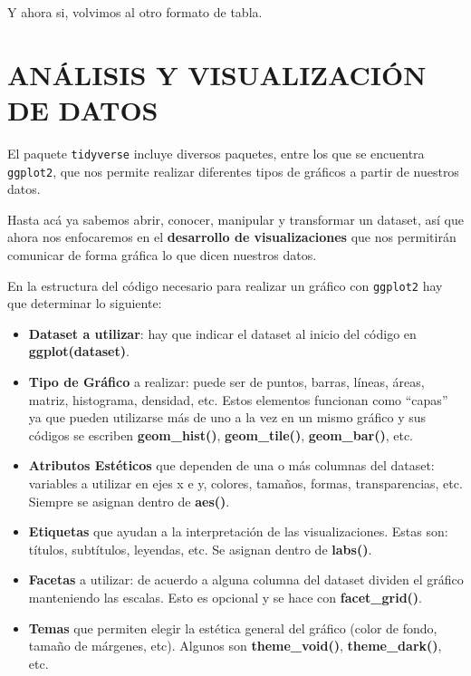 \documentclass[
  spanish,
]{book}
\providecommand{\tightlist}{%
  \setlength{\itemsep}{0pt}\setlength{\parskip}{0pt}}
\begin{document}
Y ahora si, volvimos al otro formato de tabla.

\hypertarget{anuxe1lisis-y-visualizaciuxf3n-de-datos}{%
\chapter{ANÁLISIS Y VISUALIZACIÓN DE DATOS}\label{anuxe1lisis-y-visualizaciuxf3n-de-datos}}

El paquete \texttt{tidyverse} incluye diversos paquetes, entre los que se encuentra \texttt{ggplot2}, que nos permite realizar diferentes tipos de gráficos a partir de nuestros datos.

Hasta acá ya sabemos abrir, conocer, manipular y transformar un dataset, así que ahora nos enfocaremos en el \textbf{desarrollo de visualizaciones} que nos permitirán comunicar de forma gráfica lo que dicen nuestros datos.

En la estructura del código necesario para realizar un gráfico con \texttt{ggplot2} hay que determinar lo siguiente:

\begin{itemize}
\tightlist
\item
  \textbf{Dataset a utilizar}: hay que indicar el dataset al inicio del código en \textbf{ggplot(dataset)}.
\item
  \textbf{Tipo de Gráfico} a realizar: puede ser de puntos, barras, líneas, áreas, matriz, histograma, densidad, etc. Estos elementos funcionan como ``capas'' ya que pueden utilizarse más de uno a la vez en un mismo gráfico y sus códigos se escriben \textbf{geom\_hist()}, \textbf{geom\_tile()}, \textbf{geom\_bar()}, etc.
\item
  \textbf{Atributos Estéticos} que dependen de una o más columnas del dataset: variables a utilizar en ejes x e y, colores, tamaños, formas, transparencias, etc. Siempre se asignan dentro de \textbf{aes()}.
\item
  \textbf{Etiquetas} que ayudan a la interpretación de las visualizaciones. Estas son: títulos, subtítulos, leyendas, etc. Se asignan dentro de \textbf{labs()}.
\item
  \textbf{Facetas} a utilizar: de acuerdo a alguna columna del dataset dividen el gráfico manteniendo las escalas. Esto es opcional y se hace con \textbf{facet\_grid()}.
\item
  \textbf{Temas} que permiten elegir la estética general del gráfico (color de fondo, tamaño de márgenes, etc). Algunos son \textbf{theme\_void()}, \textbf{theme\_dark()}, etc.
\end{itemize}
\end{document}
